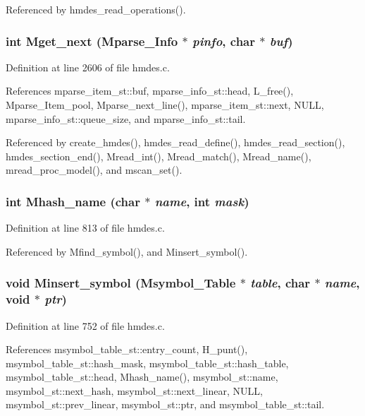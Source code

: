 Referenced by hmdes\_\-read\_\-operations().
\subsubsection{\setlength{\rightskip}{0pt plus 5cm}int Mget\_\-next (\bf{Mparse\_\-Info} $\ast$ {\em pinfo}, char $\ast$ {\em buf})}\label{hmdes_8c_3048440efa1af4a82f688116e0e0c54b}




Definition at line 2606 of file hmdes.c.

References mparse\_\-item\_\-st::buf, mparse\_\-info\_\-st::head, L\_\-free(), Mparse\_\-Item\_\-pool, Mparse\_\-next\_\-line(), mparse\_\-item\_\-st::next, NULL, mparse\_\-info\_\-st::queue\_\-size, and mparse\_\-info\_\-st::tail.

Referenced by create\_\-hmdes(), hmdes\_\-read\_\-define(), hmdes\_\-read\_\-section(), hmdes\_\-section\_\-end(), Mread\_\-int(), Mread\_\-match(), Mread\_\-name(), mread\_\-proc\_\-model(), and mscan\_\-set().
\subsubsection{\setlength{\rightskip}{0pt plus 5cm}int Mhash\_\-name (char $\ast$ {\em name}, int {\em mask})}\label{hmdes_8c_bd9725ae2e255beb2f27b69261855d05}




Definition at line 813 of file hmdes.c.

Referenced by Mfind\_\-symbol(), and Minsert\_\-symbol().
\subsubsection{\setlength{\rightskip}{0pt plus 5cm}void Minsert\_\-symbol (\bf{Msymbol\_\-Table} $\ast$ {\em table}, char $\ast$ {\em name}, void $\ast$ {\em ptr})}\label{hmdes_8c_74d2d13e74689801a91905ef832e65af}




Definition at line 752 of file hmdes.c.

References msymbol\_\-table\_\-st::entry\_\-count, H\_\-punt(), msymbol\_\-table\_\-st::hash\_\-mask, msymbol\_\-table\_\-st::hash\_\-table, msymbol\_\-table\_\-st::head, Mhash\_\-name(), msymbol\_\-st::name, msymbol\_\-st::next\_\-hash, msymbol\_\-st::next\_\-linear, NULL, msymbol\_\-st::prev\_\-linear, msymbol\_\-st::ptr, and msymbol\_\-table\_\-st::tail.

